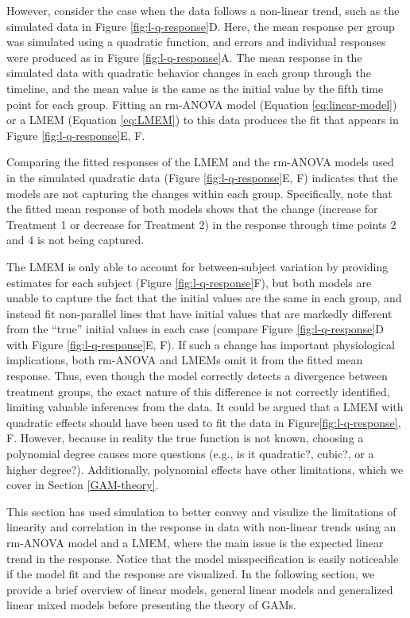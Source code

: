 \documentclass[
]{article}
\begin{document}
However, consider the case when the data follows a non-linear trend, such as the simulated data in Figure \ref{fig:l-q-response}D. Here, the mean response per group was simulated using a quadratic function, and errors and individual responses were produced as in Figure \ref{fig:l-q-response}A. The mean response in the simulated data with quadratic behavior changes in each group through the timeline, and the mean value is the same as the initial value by the fifth time point for each group. Fitting an rm-ANOVA model (Equation \eqref{eq:linear-model}) or a LMEM (Equation \eqref{eq:LMEM}) to this data produces the fit that appears in Figure \ref{fig:l-q-response}E, F.

Comparing the fitted responses of the LMEM and the rm-ANOVA models used in the simulated quadratic data (Figure \ref{fig:l-q-response}E, F) indicates that the models are not capturing the changes within each group. Specifically, note that the fitted mean response of both models shows that the change (increase for Treatment 1 or decrease for Treatment 2) in the response through time points 2 and 4 is not being captured.

The LMEM is only able to account for between-subject variation by providing estimates for each subject (Figure \ref{fig:l-q-response}F), but both models are unable to capture the fact that the initial values are the same in each group, and instead fit non-parallel lines that have initial values that are markedly different from the ``true'' initial values in each case (compare Figure \ref{fig:l-q-response}D with Figure \ref{fig:l-q-response}E, F). If such a change has important physiological implications, both rm-ANOVA and LMEMs omit it from the fitted mean response. Thus, even though the model correctly detects a divergence between treatment groups, the exact nature of this difference is not correctly identified, limiting valuable inferences from the data. It could be argued that a LMEM with quadratic effects should have been used to fit the data in Figure\ref{fig:l-q-response}, F. However, because in reality the true function is not known, choosing a polynomial degree causes more questions (e.g., is it quadratic?, cubic?, or a higher degree?). Additionally, polynomial effects have other limitations, which we cover in Section \ref{GAM-theory}.

This section has used simulation to better convey and visulize the limitations of linearity and correlation in the response in data with non-linear trends using an rm-ANOVA model and a LMEM, where the main issue is the expected linear trend in the response. Notice that the model misspecification is easily noticeable if the model fit and the response are visualized. In the following section, we provide a brief overview of linear models, general linear models and generalized linear mixed models before presenting the theory of GAMs.
\end{document}

